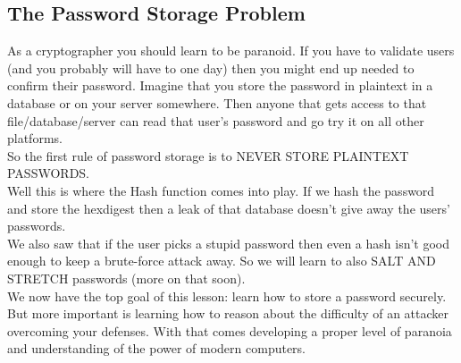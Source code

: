 \documentclass[12pt]{book}
\begin{document}
\subsection{The Password Storage Problem}

As a cryptographer you should learn to be paranoid. If you have to validate users (and you probably will have to one day) then you might end up needed to confirm their password. Imagine that you store the password in plaintext in a database or on your server somewhere. Then anyone that gets access to that file/database/server can read that user's password and go try it on all other platforms.\\

So the first rule of password storage is to NEVER STORE PLAINTEXT PASSWORDS.\\

Well this is where the Hash function comes into play. If we hash the password and store the hexdigest then a leak of that database doesn't give away the users' passwords.\\

We also saw that if the user picks a stupid password then even a hash isn't good enough to keep a brute-force attack away. So we will learn to also SALT AND STRETCH passwords (more on that soon).\\

We now have the top goal of this lesson: learn how to store a password securely. But more important is learning how to reason about the difficulty of an attacker overcoming your defenses. With that comes developing a proper level of paranoia and understanding of the power of modern computers.
\end{document}
